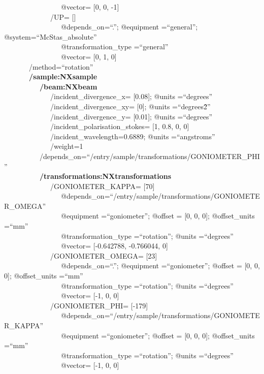 \documentclass[11pt]{a0poster}
\begin{document}
\begin{minipage}[]{0.29\linewidth}
\-\ ~~~~~~~~~~~~~~~@vector= [0, 0, -1]\\
\-\ ~~~~~~~~~~~~/UP= []\\
\-\ ~~~~~~~~~~~~~~~@depends\_on=``.''; @equipment =``general''; @system=``McStas\_absolute''\\
\-\ ~~~~~~~~~~~~~~~@transformation\_type =``general''\\
\-\ ~~~~~~~~~~~~~~~@vector= [0, 1, 0]\\
\-\ ~~~~~~/method=``rotation''\\
\-\ ~~~~~~{\bf /sample:NXsample}\\
\-\ ~~~~~~~~~{\bf /beam:NXbeam}\\
\-\ ~~~~~~~~~~~~/incident\_divergence\_x= [0.08]; @units =``degrees''\\
\-\ ~~~~~~~~~~~~/incident\_divergence\_xy= [0]; @units =``degrees\^2''\\
\-\ ~~~~~~~~~~~~/incident\_divergence\_y= [0.01]; @units =``degrees''\\
\-\ ~~~~~~~~~~~~/incident\_polarisation\_stokes= [1, 0.8, 0, 0]\\
\-\ ~~~~~~~~~~~~/incident\_wavelength=0.6889; @units =``angstroms''\\
\-\ ~~~~~~~~~~~~/weight=1\\
\-\ ~~~~~~~~~/depends\_on=``/entry/sample/transformations/GONIOMETER\_PHI''\\
\-\ ~~~~~~~~~{\bf /transformations:NXtransformations}\\
\-\ ~~~~~~~~~~~~/GONIOMETER\_KAPPA= [70]\\
\-\ ~~~~~~~~~~~~~~~@depends\_on=``/entry/sample/transformations/GONIOMETER\_OMEGA''\\
\-\ ~~~~~~~~~~~~~~~@equipment =``goniometer''; @offset = [0, 0, 0]; @offset\_units =``mm''\\
\-\ ~~~~~~~~~~~~~~~@transformation\_type =``rotation''; @units =``degrees''\\
\-\ ~~~~~~~~~~~~~~~@vector= [-0.642788, -0.766044, 0]\\
\-\ ~~~~~~~~~~~~/GONIOMETER\_OMEGA= [23]\\
\-\ ~~~~~~~~~~~~~~~@depends\_on=``.''; @equipment =``goniometer''; @offset = [0, 0, 0]; @offset\_units =``mm''\\
\-\ ~~~~~~~~~~~~~~~@transformation\_type =``rotation''; @units =``degrees''\\
\-\ ~~~~~~~~~~~~~~~@vector= [-1, 0, 0]\\
\-\ ~~~~~~~~~~~~/GONIOMETER\_PHI= [-179]\\
\-\ ~~~~~~~~~~~~~~~@depends\_on=``/entry/sample/transformations/GONIOMETER\_KAPPA''\\
\-\ ~~~~~~~~~~~~~~~@equipment =``goniometer''; @offset = [0, 0, 0]; @offset\_units =``mm''\\
\-\ ~~~~~~~~~~~~~~~@transformation\_type =``rotation''; @units =``degrees''\\
\-\ ~~~~~~~~~~~~~~~@vector= [-1, 0, 0]\\
\vspace{-9mm}
\begin{itemize}


\end{itemize}
\end{minipage}
\end{document}
